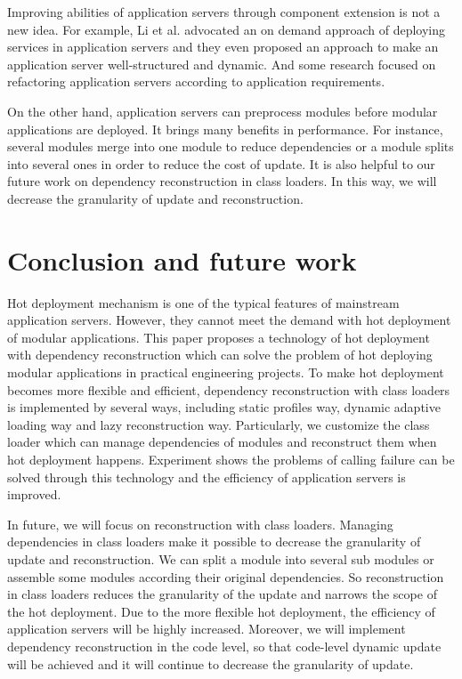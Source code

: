 \documentclass[conference]{IEEEtran}
\begin{document}
Improving abilities of application servers through component extension is not a new idea.
For example, Li et al. advocated an on demand approach of deploying services in application servers\cite{related_AS_1} and they even proposed an approach to make an application server well-structured and dynamic\cite{related_AS_2}.
And some research focused on refactoring application servers according to application requirements\cite{related_AS_3}.
	
On the other hand, application servers can preprocess modules before modular applications are deployed.
It brings many benefits in performance. For instance, several modules merge into one module to reduce dependencies\cite{related_merge} or a module splits into several ones in order to reduce the cost of update\cite{related_split}.
It is also helpful to our future work on dependency reconstruction in class loaders.
In this way, we will decrease the granularity of update and reconstruction.


\section{Conclusion and future work\label{sec:conclusion}}
Hot deployment mechanism is one of the typical features of mainstream application servers.
However, they cannot meet the demand with hot deployment of modular applications.
This paper proposes a technology of hot deployment with dependency reconstruction which can solve the problem of hot deploying modular applications in practical engineering projects.
To make hot deployment becomes more flexible and efficient, dependency reconstruction with class loaders is implemented by several ways, including static profiles way, dynamic adaptive loading way and lazy reconstruction way.
Particularly, we customize the class loader which can manage dependencies of modules and reconstruct them when hot deployment happens.
Experiment shows the problems of calling failure can be solved through this technology and the efficiency of application servers is improved.

In future, we will focus on reconstruction with class loaders.
Managing dependencies in class loaders make it possible to decrease the granularity of update and reconstruction.
We can split a module into several sub modules or assemble some modules according their original dependencies.
So reconstruction in class loaders reduces the granularity of the update and narrows the scope of the hot deployment.
Due to the more flexible hot deployment, the efficiency of application servers will be highly increased.
Moreover, we will implement dependency reconstruction in the code level\cite{future_Gu}, so that code-level dynamic update will be achieved and it will continue to decrease the granularity of update.
\end{document}
